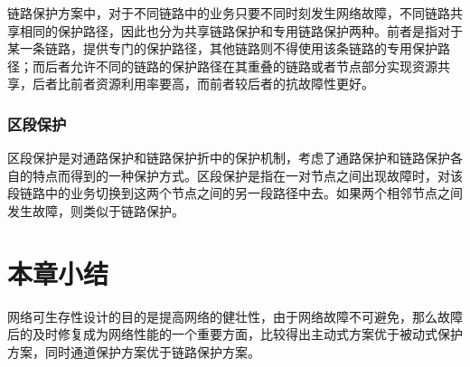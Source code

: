 链路保护方案中，对于不同链路中的业务只要不同时刻发生网络故障，不同链路共享相同的保护路径，因此也分为共享链路保护和专用链路保护两种。前者是指对于某一条链路，提供专门的保护路径，其他链路则不得使用该条链路的专用保护路径；而后者允许不同的链路的保护路径在其重叠的链路或者节点部分实现资源共享，后者比前者资源利用率要高，而前者较后者的抗故障性更好。
\subsubsection{区段保护}
区段保护是对通路保护和链路保护折中的保护机制，考虑了通路保护和链路保护各自的特点而得到的一种保护方式。区段保护是指在一对节点之间出现故障时，对该段链路中的业务切换到这两个节点之间的另一段路径中去。如果两个相邻节点之间发生故障，则类似于链路保护。
\section{本章小结}
网络可生存性设计的目的是提高网络的健壮性，由于网络故障不可避免，那么故障后的及时修复成为网络性能的一个重要方面，比较得出主动式方案优于被动式保护方案，同时通道保护方案优于链路保护方案。



